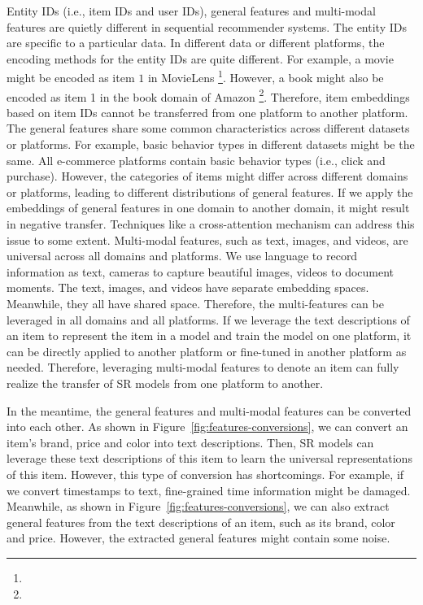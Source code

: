 \documentclass[review]{fcs}
\begin{document}
	Entity IDs (i.e., item IDs and user IDs), general features and multi-modal features are quietly different in sequential recommender systems. The entity IDs are specific to a particular data. In different data or different platforms, the encoding methods for the entity IDs are quite different. For example, a movie might be encoded as item $1$ in MovieLens \footnote{}. However, a book might also be encoded as item 1 in the book domain of Amazon \footnote{}. Therefore, item embeddings based on item IDs cannot be transferred from one platform to another platform. The general features share some common characteristics across different datasets or platforms. For example, basic behavior types in different datasets might be the same. All e-commerce platforms contain basic behavior types (i.e., click and purchase). However, the categories of items might differ across different domains or platforms, leading to different distributions of general features. If we apply the embeddings of general features in one domain to another domain, it might result in negative transfer. Techniques like a cross-attention mechanism can address this issue to some extent. Multi-modal features, such as text, images, and videos, are universal across all domains and platforms. We use language to record information as text, cameras to capture beautiful images, videos to document moments. The text, images, and videos have separate embedding spaces. Meanwhile, they all have shared space. Therefore, the multi-features can be leveraged in all domains and all platforms. If we leverage the text descriptions of an item to represent the item in a model and train the model on one platform, it can be directly applied to another platform or fine-tuned in another platform as needed. Therefore, leveraging multi-modal features to denote an item can fully realize the transfer of SR models from one platform to another.
	
	In the meantime, the general features and multi-modal features can be converted into each other. As shown in Figure~\ref{fig:features-conversions}, we can convert an item's brand, price and color into text descriptions. Then, SR models can leverage these text descriptions of this item to learn the universal representations of this item. However, this type of conversion has shortcomings. For example, if we convert timestamps to text, fine-grained time information might be damaged. Meanwhile, as shown in Figure~\ref{fig:features-conversions}, we can also extract general features from the text descriptions of an item, such as its brand, color and price. However, the extracted general features might contain some noise.
	
\end{document}
